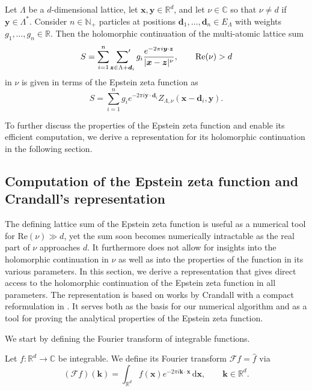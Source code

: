 \documentclass[]{amsart}
\newcommand{\new}[1]{#1}
\newcommand{\zeps}[3]{\new{Z_{#1} (#2, #3)}}
\newcommand{\sums}{\sideset{}{'} \sum}
\renewcommand{\Re}[1]{\mathrm{Re}(#1)}
\newcommand{\crandallreqs}{
Let \(\Lambda\) be a \(d\)-dimensional lattice,
let \(\bm x,\bm y\in\mathds{R}^d\), and let \(\nu\in\mathds C\)
so that \(\nu\neq d\) if \(\bm y\in\Lambda^{\ast}\). }
\numberwithin{mythm}{section}
\begin{document}
\begin{remark}
\crandallreqs
Consider $n\in\mathds N_+$ particles at positions $\bm d_1,\ldots,\bm d_n\in E_{\Lambda}$
with weights $g_1,\ldots,g_n\in\mathds R$.
Then the holomorphic continuation of the multi-atomic lattice sum
$$
S=\sum_{i=1}^n \sums_{\bm z\in \Lambda+\bm d_i}g_i\frac{e^{-2\pi i\bm y\cdot \bm z}}{|\bm x-\bm z|^{\nu}}
,\qquad 
\Re\nu >d
$$
in $\nu$ is given in terms of the Epstein zeta function as 
$$
S=\sum_{i=1}^ng_ie^{-2\pi i \bm y\cdot \bm d_i}
\zeps{\Lambda,\nu}{\bm x-\bm d_i}{\bm y}.
$$
\end{remark}


To further discuss the properties of the Epstein zeta function and enable its efficient computation, we derive a representation for its holomorphic continuation in the following section.



\subsection{Computation of the Epstein zeta function and Crandall's representation}

The defining lattice sum of the Epstein zeta function is useful as a numerical tool for $\mathrm{Re}(\nu)\gg d$, yet the sum soon becomes numerically intractable as the real part of $\nu$ approaches $d$. It furthermore
does not allow for insights into the holomorphic continuation in $\nu$ as well as into
the properties of the function in its various parameters.
In this section, we derive
a representation that gives direct access to the holomorphic continuation of the
Epstein zeta function in all parameters. The representation is based on works
by Crandall \cite{crandall2012unified} with a compact reformulation in \cite{buchheitComputationLatticeSums2024}. It serves both as the basis for our numerical algorithm
and as a tool for proving the analytical properties of the Epstein zeta function.


We start by defining the Fourier transform of integrable functions.
\begin{definition}
Let $f :\mathds{R}^d \rightarrow \mathds{C}$ be integrable. We define its Fourier transform $\mathcal{F} f = \hat{f}$ via
\[
(\mathcal{F}f)(\bm k)
=\int_{\mathds{R}^d} f(\bm x)e^{-2\pi i\bm k\cdot\bm x}\,\mathrm{d}\bm x
,\qquad \bm k \in\mathds R^d.
\]
\end{definition}
\end{document}
